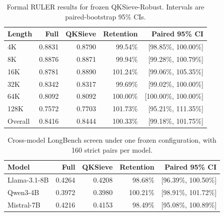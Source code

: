 \begin{table}[t]
\caption{Formal RULER results for frozen QKSieve-Robust. Intervals are paired-bootstrap 95\% CIs.}
\label{tab:ruler-formal}
\centering
\small
\begin{tabular}{lrrrr}
\toprule
Length & Full & QKSieve & Retention & Paired 95\% CI \\
\midrule
4K & 0.8831 & 0.8790 & 99.54\% & [98.85\%, 100.00\%] \\
8K & 0.8876 & 0.8871 & 99.94\% & [99.28\%, 100.79\%] \\
16K & 0.8781 & 0.8890 & 101.24\% & [99.06\%, 105.35\%] \\
32K & 0.8342 & 0.8317 & 99.69\% & [99.02\%, 100.00\%] \\
64K & 0.8092 & 0.8092 & 100.00\% & [100.00\%, 100.00\%] \\
128K & 0.7572 & 0.7703 & 101.73\% & [95.21\%, 111.35\%] \\
\midrule
Overall & 0.8416 & 0.8444 & 100.33\% & [99.18\%, 101.75\%] \\
\bottomrule
\end{tabular}
\end{table}

\begin{table}[t]
\caption{Cross-model LongBench screen under one frozen configuration, with 160 strict pairs per model.}
\label{tab:multimodel-formal}
\centering
\small
\begin{tabular}{lrrrr}
\toprule
Model & Full & QKSieve & Retention & Paired 95\% CI \\
\midrule
Llama-3.1-8B & 0.4264 & 0.4208 & 98.68\% & [96.39\%, 100.50\%] \\
Qwen3-4B & 0.3972 & 0.3980 & 100.21\% & [98.91\%, 101.72\%] \\
Mistral-7B & 0.4216 & 0.4153 & 98.49\% & [95.08\%, 100.89\%] \\
\bottomrule
\end{tabular}
\end{table}
